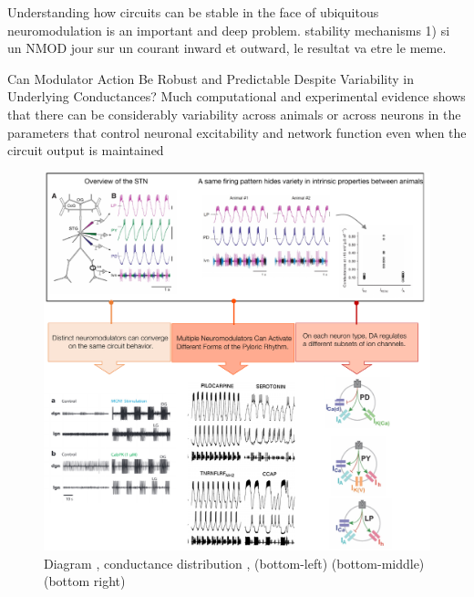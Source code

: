 \begin{pinkshaded}
Understanding how circuits can be stable in the face of ubiquitous neuromodulation is an important and deep problem.
stability mechanisms 1) si un NMOD jour sur un courant inward et outward, le resultat va etre le meme. 


Can Modulator Action Be Robust and Predictable Despite Variability in Underlying Conductances? Much computational and experimental evidence shows that there can be considerably variability across animals or across neurons in the parameters that control neuronal excitability and network function even when the circuit output is maintained

\end{pinkshaded}



\begin{figure}[h!]
    \centering
    \includegraphics{latex/fig/Intro/Bgd_Marder.pdf}
    \caption{Diagram \citep{marder_neuroscience_2021}, conductance distribution \citep{schulz_variable_2006}, (bottom-left)  \citep{marder_neuromodulation_2014} (bottom-middle) \citep{marder_neuromodulation_2012}  (bottom right) \citep{marder_understanding_2007}}
    \label{fig:my_label}
\end{figure}

\newpage
~\\
\newpage
%
%
